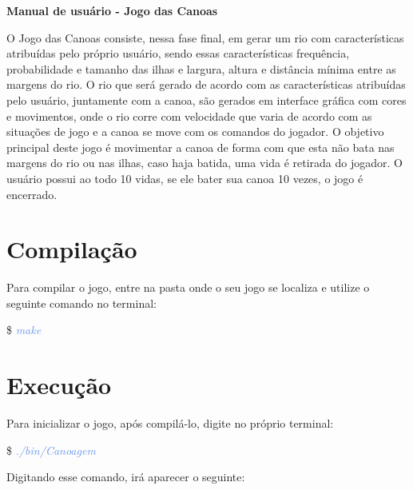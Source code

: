 \documentclass[a4paper,12pt]{article}
\begin{document}
  \begin{center}
	{\LARGE \textcolor{NavyBlue}{ \textbf{Manual de usuário - Jogo das Canoas}}}
  \end{center}

  \bigskip
  \bigskip

  O Jogo das Canoas consiste, nessa fase final, em gerar um rio com 
  características atribuídas pelo próprio usuário, sendo essas características 
  frequência, probabilidade e tamanho das ilhas e largura, altura e distância
  mínima entre as margens do rio. O rio que será gerado de acordo com as 
  características atribuídas pelo usuário, juntamente com a canoa, são gerados 
  em interface gráfica com cores e movimentos, onde o rio corre com velocidade
  que varia de acordo com as situações de jogo e a canoa se move com os comandos
  do jogador. O objetivo principal deste jogo é movimentar a canoa de forma com
  que esta não bata nas margens do rio ou nas ilhas, caso haja batida, uma vida é
  retirada do jogador. O usuário possui ao todo 10 vidas, se ele bater sua canoa 
  10 vezes, o jogo é encerrado.


\newpage %
\section{\textcolor{NavyBlue}{Compilação}}

Para compilar o jogo, entre na pasta onde o seu jogo se localiza e utilize o seguinte comando no terminal:

\$ \textcolor{CornflowerBlue}{\textit{make}}

\bigskip
\section{\textcolor{NavyBlue}{Execução}}

  Para inicializar o jogo, após compilá-lo, digite no próprio terminal:
  
  \$ \textcolor{CornflowerBlue}{\textit{./bin/Canoagem}}
  
  Digitando esse comando, irá aparecer o seguinte:
\end{document}
